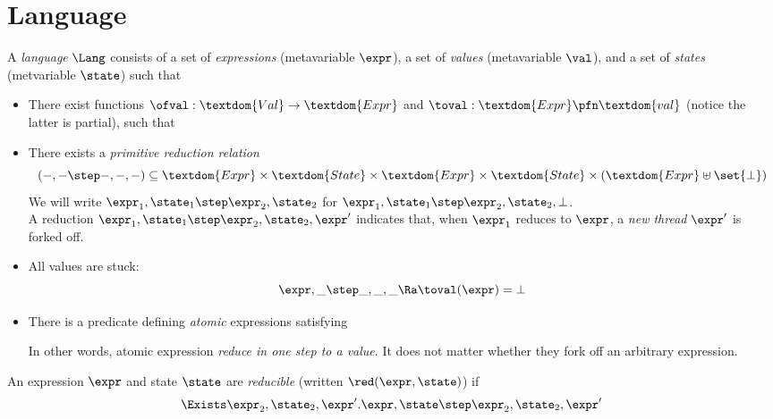 \section{Language}

A \emph{language} $\Lang$ consists of a set  of \emph{expressions} (metavariable $\expr$), a set  of \emph{values} (metavariable $\val$), and a set  of \emph{states} (metvariable $\state$) such that
\begin{itemize}
\item There exist functions $\ofval : \textdom{Val} \to \textdom{Expr}$ and $\toval : \textdom{Expr} \pfn \textdom{val}$ (notice the latter is partial), such that
\item There exists a \emph{primitive reduction relation} \[(-,- \step -,-,-) \subseteq \textdom{Expr} \times \textdom{State} \times \textdom{Expr} \times \textdom{State} \times (\textdom{Expr} \uplus \set{\bot})\]
  We will write $\expr_1, \state_1 \step \expr_2, \state_2$ for $\expr_1, \state_1 \step \expr_2, \state_2, \bot$. \\
  A reduction $\expr_1, \state_1 \step \expr_2, \state_2, \expr'$ indicates that, when $\expr_1$ reduces to $\expr$, a \emph{new thread} $\expr'$ is forked off.
\item All values are stuck:
\[ \expr, \_ \step  \_, \_, \_ \Ra \toval(\expr) = \bot \]
\item There is a predicate defining \emph{atomic} expressions satisfying
\let\oldcr\cr
{}
In other words, atomic expression \emph{reduce in one step to a value}.
It does not matter whether they fork off an arbitrary expression.
\end{itemize}

\begin{defn}
  An expression $\expr$ and state $\state$ are \emph{reducible} (written $\red(\expr, \state)$) if
  \[ \Exists \expr_2, \state_2, \expr'. \expr,\state \step \expr_2,\state_2,\expr' \]
\end{defn}

